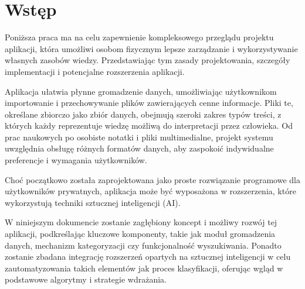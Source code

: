 \documentclass[12pt,a4paper,twoside]{article}
\begin{document}
\section*{Wstęp}
Poniższa praca ma na celu zapewnienie kompleksowego przeglądu projektu aplikacji, która umożliwi osobom fizycznym lepsze zarządzanie i wykorzystywanie własnych zasobów wiedzy. Przedstawiając tym zasady projektowania, szczegóły implementacji i potencjalne rozszerzenia aplikacji.\par
Aplikacja ułatwia płynne gromadzenie danych, umożliwiając użytkownikom importowanie i przechowywanie plików zawierających cenne informacje. Pliki te, określane zbiorczo jako zbiór danych, obejmują szeroki zakres typów treści, z których każdy reprezentuje wiedzę możliwą do interpretacji przez człowieka. Od prac naukowych po osobiste notatki i pliki multimedialne, projekt systemu uwzględnia obsługę różnych formatów danych, aby zaspokoić indywidualne preferencje i wymagania użytkowników.\par
Choć początkowo została zaprojektowana jako proste rozwiązanie programowe dla użytkowników prywatnych, aplikacja może być wyposażona w rozszerzenia, które wykorzystują techniki sztucznej inteligencji (AI).\par
W niniejszym dokumencie zostanie zagłębiony koncept i możliwy rozwój tej aplikacji, podkreślając kluczowe komponenty, takie jak moduł gromadzenia danych, mechanizm kategoryzacji czy funkcjonalność wyszukiwania. Ponadto zostanie zbadana integrację rozszerzeń opartych na sztucznej inteligencji w celu zautomatyzowania takich elementów jak proces klasyfikacji, oferując wgląd w podstawowe algorytmy i strategie wdrażania.
\newpage
\end{document}
